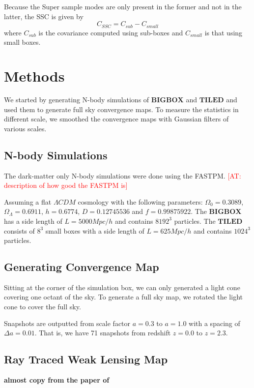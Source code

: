 \documentclass[fleqn,usenatbib]{mnras}
\newcommand{\akira}[1]{\textcolor{red}{[AT: #1]}}
\begin{document}
Because the Super sample modes are only present in the former and not in the latter, the SSC is given by 
\begin{equation}
    C_{SSC} = C_{sub} - C_{small}
\end{equation}
where $C_{sub}$ is the covariance computed using sub-boxes and $C_{small}$ is that using small boxes.

\section{Methods}
\label{sec:method}
We started by generating N-body simulations of $\boldsymbol{BIGBOX}$ and $\boldsymbol{TILED}$ and used them to generate full sky convergence maps. 
To measure the statistics in different scale, we smoothed the convergence maps with Gaussian filters of various scales.

\subsection{N-body Simulations}
The dark-matter only N-body simulations were done using the FASTPM. \akira{description of how good the FASTPM is}

Assuming a flat $\Lambda CDM$ cosmology with the following parameters: 
$\Omega_0 = 0.3089$, $\Omega_\Lambda = 0.6911$, $h = 0.6774$, $D = 0.12745536$ and $f = 0.99875922$. 
The $\boldsymbol{BIGBOX}$ has a side length of $L = 5000 Mpc/h$ and contains $8192^3$ particles.
The $\boldsymbol{TILED}$ consists of $8^3$ small boxes with a side length of $L = 625 Mpc/h$ and contains $1024^3$ particles.

\subsection{Generating Convergence Map}
Sitting at the corner of the simulation box, we can only generated a light cone covering one octant of the sky.
To generate a full sky map, we rotated the light cone to cover the full sky.

Snapshots are outputted from scale factor $a = 0.3$ to $a = 1.0$ with a spacing of $\Delta a = 0.01$.
That is, we have 71 snapshots from redshift $z = 0.0$ to $z = 2.3$.




\subsection{Ray Traced Weak Lensing Map}
\textbf{almost copy from the paper of \cite{10.1093/mnras/stab395}}
\end{document}
